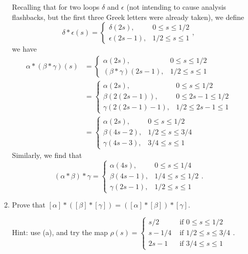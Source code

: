 \documentclass[letterpaper,12pt]{article}
\newcommand{\cla}[1]{\left[ #1\right]}
\begin{document}
\begin{enumerate}
\begin{enumerate}
Recalling that for two loops $\delta$ and $\epsilon$ (not intending to cause analysis flashbacks, but the first three Greek letters were already taken), we define
\[
 \delta\ast\epsilon(s) = \begin{cases}\delta(2s), & 0\leq s\leq 1/2\\ \epsilon(2s-1), & 1/2\leq s\leq 1\end{cases},
\]
we have
\begin{align*}
 \alpha\ast(\beta\ast\gamma)(s) &= \begin{cases} 
 				   \alpha(2s), & 0\leq s\leq 1/2\\
                                   (\beta\ast\gamma)(2s-1), & 1/2\leq s\leq 1
                                  \end{cases}\\
& = \begin{cases}
\alpha(2s), & 0\leq s\leq 1/2\\
\beta(2(2s-1)), & 0\leq 2s-1\leq 1/2\\
\gamma(2(2s-1)-1), &  1/2\leq 2s-1\leq 1
\end{cases}\\
& = \begin{cases}
     \alpha(2s), & 0\leq s\leq 1/2\\
     \beta(4s-2), & 1/2\leq s\leq 3/4\\
     \gamma(4s-3), & 3/4\leq s\leq 1
    \end{cases}
\end{align*}
Similarly, we find that
\[
 (\alpha\ast\beta)\ast\gamma = \begin{cases} \alpha(4s), &0\leq s\leq 1/4\\ \beta(4s-1), & 1/4\leq s\leq 1/2\\\gamma(2s-1), & 1/2\leq s\leq 1\end{cases}.
\]

\bigskip

\item Prove that $\cla{\alpha}\ast(\cla{\beta}\ast\cla{\gamma}) = (\cla{\alpha}\ast\cla{\beta})\ast\cla{\gamma}$.

Hint: use (a), and try the map $\displaystyle \rho(s)=\begin{cases} s/2 & \text{ if } 0\leq s\leq 1/2\\ s-1/4 & \text{ if } 1/2\leq s\leq 3/4\\ 2s-1 & \text{ if } 3/4\leq s\leq 1\end{cases}$.

\bigskip


\end{enumerate}
\end{enumerate}
\end{document}
